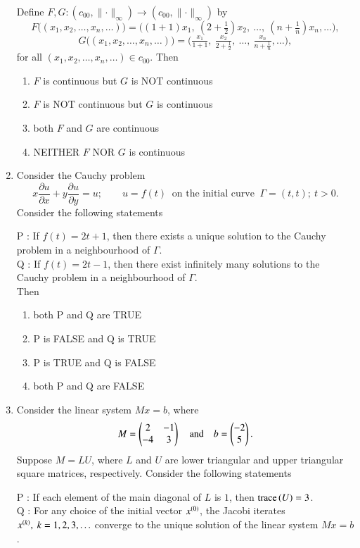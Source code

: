 \documentclass[journal,12pt,onecolumn]{IEEEtran}
\theoremstyle{remark}
\begin{document}
\begin{enumerate}[start=1, label=Q.\arabic*]
Define $F,G:(c_{00},\lVert\cdot\rVert_{\infty})\to(c_{00},\lVert\cdot\rVert_{\infty})$ by
\[
F\big((x_{1},x_{2},\dots,x_{n},\dots)\big)=\big((1+1)x_{1},\ (2+\tfrac{1}{2})x_{2},\ \dots,\ (n+\tfrac{1}{n})x_{n},\dots\big),
\]
\[
G\big((x_{1},x_{2},\dots,x_{n},\dots)\big)=\big(\tfrac{x_{1}}{1+1},\ \tfrac{x_{2}}{2+\tfrac{1}{2}},\ \dots,\ \tfrac{x_{n}}{n+\tfrac{1}{n}},\dots\big),
\]
for all $(x_{1},x_{2},\dots,x_{n},\dots)\in c_{00}$. Then
\begin{enumerate}
\item $F$ is continuous but $G$ is NOT continuous
\item $F$ is NOT continuous but $G$ is continuous
\item both $F$ and $G$ are continuous
\item NEITHER $F$ NOR $G$ is continuous
\end{enumerate}

\hfill{}


\item Consider the Cauchy problem
\[
x\frac{\partial u}{\partial x}+y\frac{\partial u}{\partial y}=u;\qquad u=f(t)\ \text{ on the initial curve }\ \Gamma=(t,t);\ t>0.
\]
Consider the following statements\brak{:}

P : If $f(t)=2t+1$, then there exists a unique solution to the Cauchy problem in a neighbourhood of $\Gamma$.\\
Q : If $f(t)=2t-1$, then there exist infinitely many solutions to the Cauchy problem in a neighbourhood of $\Gamma$.\\

Then
\begin{enumerate}
\item both P and Q are TRUE
\item P is FALSE and Q is TRUE
\item P is TRUE and Q is FALSE
\item both P and Q are FALSE
\end{enumerate}

\hfill{}

\item Consider the linear system $Mx=b$, where 
\[
M=\begin{pmatrix}2 & -1\\ -4 & 3\end{pmatrix} \quad \text{and} \quad b=\begin{pmatrix}-2\\ 5\end{pmatrix}.
\]
Suppose $M=LU$, where $L$ and $U$ are lower triangular and upper triangular square matrices, respectively. Consider the following statements\brak{:}

P : If each element of the main diagonal of $L$ is $1$, then $\text{trace}\left(U\right)=3$.\\
Q : For any choice of the initial vector $x^{\left(0\right)}$, the Jacobi iterates $x^{\left(k\right)},\ k=1,2,3,\ldots$ converge to the unique solution of the linear system $Mx=b$.\\


\end{enumerate}
\end{document}
